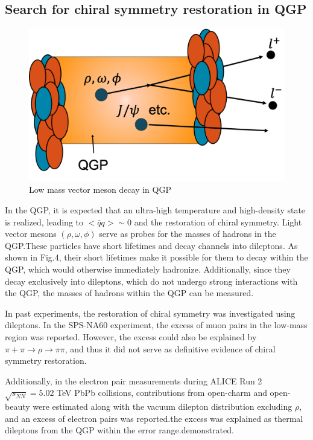     \subsection{Search for chiral symmetry restoration in QGP}
        \begin{figure}[hbtp]
            \centering
            \includegraphics[keepaspectratio, scale=0.2]{fig/1_7_Search_for_chiral.png}
            \caption{Low mass vector meson decay in QGP}
            \label{Intro:Search_for_CSR:Low_mass_vector_meson_decay_in_QGP}
        \end{figure}
        
        In the QGP, it is expected that an ultra-high temperature and high-density state is realized, leading to $ < \bar{q}q > \sim 0 $ and the restoration of chiral symmetry. Light vector mesons $(\rho, \omega, \phi)$ serve as probes for the masses of hadrons in the QGP.\@ These particles have short lifetimes and decay channels into dileptons. As shown in Fig.4, their short lifetimes make it possible for them to decay within the QGP, which would otherwise immediately hadronize. Additionally, since they decay exclusively into dileptons, which do not undergo strong interactions with the QGP, the masses of hadrons within the QGP can be measured.  
        
        In past experiments, the restoration of chiral symmetry was investigated using dileptons. In the SPS-NA60 experiment, the excess of muon pairs in the low-mass region was reported. However, the excess could also be explained by $\pi + \pi \rightarrow \rho \rightarrow \pi \pi$, and thus it did not serve as definitive evidence of chiral symmetry restoration\cite{NA60}.  
        
        Additionally, in the electron pair measurements during ALICE Run 2 $\sqrt{s_{NN}} = 5.02$ TeV PbPb collisions, contributions from open-charm and open-beauty were estimated along with the vacuum dilepton distribution excluding $\rho$, and an excess of electron pairs was reported.the excess was explained as thermal dileptons from the QGP within the error range.demonstrated\cite{ALICE:2023jef}.  
        
